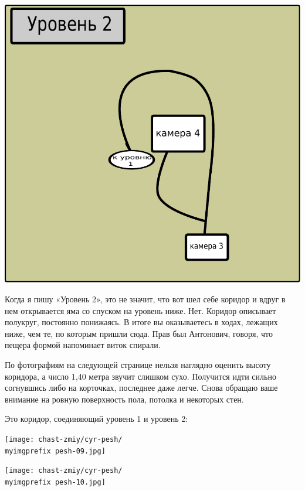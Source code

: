 \begin{center}
\includegraphics[width=\linewidth]{chast-zmiy/cyr-pesh/kirill-peshera-plan-level-02.pdf}
\end{center}

Когда я пишу «Уровень 2», это не значит, что вот шел себе коридор и вдруг в нем открывается яма со спуском на уровень ниже. Нет. Коридор описывает полукруг, постоянно понижаясь. В итоге вы оказываетесь в ходах, лежащих ниже, чем те, по которым пришли сюда. Прав был Антонович, говоря, что пещера формой напоминает виток спирали.

По фотографиям на следующей странице нельзя наглядно оценить высоту коридора, а число 1,40 метра звучит слишком сухо. Получится идти сильно согнувшись либо на корточках, последнее даже легче. Снова обращаю ваше внимание на ровную поверхность пола, потолка и некоторых стен.

\newpage

Это коридор, соединяющий уровень 1 и уровень 2:

\begin{center}
\texttt{[image: chast-zmiy/cyr-pesh/\\myimgprefix pesh-09.jpg]}
\end{center}

\begin{center}
\texttt{[image: chast-zmiy/cyr-pesh/\\myimgprefix pesh-10.jpg]}
\end{center}

